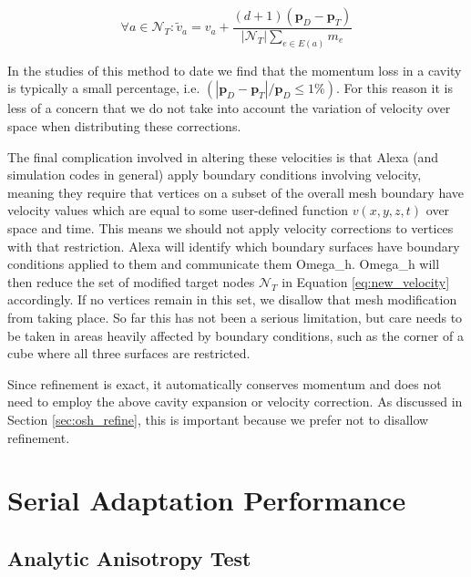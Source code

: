 \begin{equation} \label{eq:new_velocity}
\forall a \in \mathcal{N}_T:
\tilde{v}_a = v_a +
\frac{{(d+1)}(\mathbf{p}_D - \mathbf{p}_T)}{|\mathcal{N}_T|\sum_{e\in E(a)}m_e}
\end{equation}

In the studies of this method to date we find that the momentum
loss in a cavity is typically a small percentage, i.e.
$(|\mathbf{p}_D - \mathbf{p}_T|/\mathbf{p}_D \leq 1\%)$.
For this reason it is less of a concern that we do not take into
account the variation of velocity over space when distributing
these corrections.

The final complication involved in altering these velocities
is that Alexa (and simulation codes in general) apply boundary
conditions involving velocity, meaning they require that vertices
on a subset of the overall mesh boundary have velocity values
which are equal to some user-defined function $v(x,y,z,t)$
over space and time.
This means we should not apply velocity corrections to vertices
with that restriction.
Alexa will identify which boundary surfaces have boundary
conditions applied to them and communicate them Omega\_h.
Omega\_h will then reduce the set
of modified target nodes $\mathcal{N}_T$ in Equation \ref{eq:new_velocity}
accordingly.
If no vertices remain in this set, we disallow that mesh
modification from taking place.
So far this has not been a serious limitation, but care needs to
be taken in areas heavily affected by boundary conditions,
such as the corner of a cube where all three surfaces are
restricted.

Since refinement is exact, it automatically conserves momentum
and does not need to employ the above cavity expansion or velocity
correction.
As discussed in Section \ref{sec:osh_refine}, this is important
because we prefer not to disallow refinement.

\section{Serial Adaptation Performance}

\subsection{Analytic Anisotropy Test}
\label{sec:ugawg}

